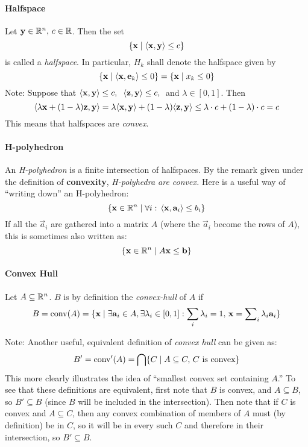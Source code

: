 \paragraph{Halfspace}
Let $\mathbf{y} \in \mathbb{R}^n,\, c \in \mathbb{R}$.  Then the set
  \[ \{\mathbf{x} \;|\; \langle \mathbf{x}, \mathbf{y} \rangle \leq c\} \]
is called a \textit{halfspace}.  In particular, $H_k$ shall denote the halfspace given by
  \[ \{\mathbf{x} \;|\; \langle \mathbf{x}, \mathbf{e}_k \rangle \leq 0 \} = 
     \{\mathbf{x} \;|\; x_k \leq 0 \} \]
Note:  Suppose that 
  $\langle \mathbf{x}, \mathbf{y} \rangle \leq c,\;$ 
  $\langle \mathbf{z}, \mathbf{y} \rangle \leq c,\;$ and
  $\lambda \in [0,1]$.  Then
  \[ \langle \lambda \mathbf{x} + (1-\lambda) \mathbf{z}, \mathbf{y} \rangle = 
    \lambda \langle \mathbf{x}, \mathbf{y} \rangle + (1-\lambda) \langle \mathbf{z}, \mathbf{y} \rangle \leq \lambda \cdot c + (1-\lambda) \cdot c = c
  \]
  This means that halfspaces are \textit{convex}.

\paragraph{H-polyhedron}
An \textit{H-polyhedron} is a finite intersection of halfspaces.  By the remark given under the definition of \textbf{convexity}, \textit{H-polyhedra are convex.}  Here is a useful way of ``writing down'' an H-polyhedron:
  \[ \{ \mathbf{x} \in \mathbb{R}^n \;|\; 
    \forall i:\, \langle \mathbf{x}, \mathbf{a}_i \rangle \leq b_i \} \]
If all the $\vec{a}_i$ are gathered into a matrix $A$ (where the $\vec{a}_i$ become the rows of $A$), this is sometimes also written as:
  \[ \{ \mathbf{x} \in \mathbb{R}^n \;|\; A\mathbf{x} \leq \mathbf{b} \} \]

\paragraph{Convex Hull}
Let $A \subseteq \mathbb{R}^n$.  $B$ is by definition the \textit{convex-hull} of $A$ if
  \[ B = \operatorname{conv}(A) = \{ \mathbf{x} \;|\; \exists \mathbf{a}_i \in A, \exists\lambda_i \in [0,1]: \sum_i \lambda_i = 1,\,\mathbf{x} = \sum\nolimits_{i} \lambda_{i} \mathbf{a}_{i} \} \]

Note: Another useful, equivalent definition of \textit{convex hull} can be given as:
\[ B' = \operatorname{conv}'(A) = \bigcap \{C \;|\; 
      A \subseteq C, \, C \text{ is convex}\} \]
This more clearly illustrates the idea of ``smallest convex set containing $A$.''  To see that these definitions are equivalent, first note that $B$ is convex, and $A \subseteq B$, so $B' \subseteq B$ (since $B$ will be included in the intersection).  Then note that if $C$ is convex and $A \subseteq C$, then any convex combination of members of $A$ must (by definition) be in $C$, so it will be in every such $C$ and therefore in their intersection, so $B' \subseteq B.$

